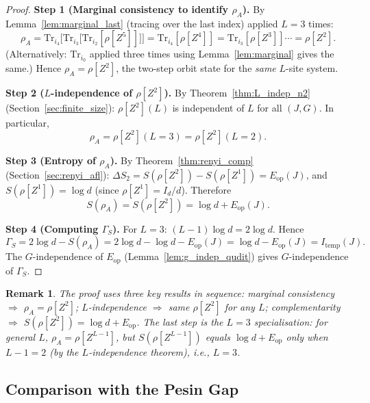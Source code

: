 \documentclass[12pt,a4paper]{article}
\newtheorem{remark}[theorem]{Remark}
\begin{document}
\begin{proof}
\textbf{Step 1 (Marginal consistency to identify $\rho_A$).}
By Lemma~\ref{lem:marginal_last} (tracing over the last index) applied $L=3$ times:
\[
  \rho_A
  = \mathrm{Tr}_{i_4}\bigl[\mathrm{Tr}_{i_3}\bigl[\mathrm{Tr}_{i_2}[\rho[Z^5]]\bigr]\bigr]
  = \mathrm{Tr}_{i_4}[\rho[Z^4]]
  = \mathrm{Tr}_{i_3}[\rho[Z^3]]
  \cdots
  = \rho[Z^2].
\]
(Alternatively: $\mathrm{Tr}_{i_0}$ applied three times using Lemma~\ref{lem:marginal} gives the same.)
Hence $\rho_A = \rho[Z^2]$, the two-step orbit state for the \emph{same} $L$-site system.

\textbf{Step 2 ($L$-independence of $\rho[Z^2]$).}
By Theorem~\ref{thm:L_indep_n2} (Section~\ref{sec:finite_size}):
$\rho[Z^2](L)$ is independent of $L$ for all $(J,G)$. In particular,
\[
  \rho_A = \rho[Z^2](L=3) = \rho[Z^2](L=2).
\]

\textbf{Step 3 (Entropy of $\rho_A$).}
By Theorem~\ref{thm:renyi_comp} (Section~\ref{sec:renyi_afl}):
$\Delta S_2 = S(\rho[Z^2])-S(\rho[Z^1]) = E_{\mathrm{op}}(J)$,
and $S(\rho[Z^1])=\log d$ (since $\rho[Z^1]=I_d/d$). Therefore
\[
  S(\rho_A) = S(\rho[Z^2]) = \log d + E_{\mathrm{op}}(J).
\]

\textbf{Step 4 (Computing $\Gamma_S$).}
For $L=3$: $(L-1)\log d = 2\log d$. Hence
\[
  \Gamma_S = 2\log d - S(\rho_A)
  = 2\log d - \log d - E_{\mathrm{op}}(J)
  = \log d - E_{\mathrm{op}}(J)
  = I_{\mathrm{temp}}(J).
\]
The $G$-independence of $E_{\mathrm{op}}$ (Lemma~\ref{lem:g_indep_qudit}) gives
$G$-independence of $\Gamma_S$.
\end{proof}

\begin{remark}
The proof uses three key results in sequence:
marginal consistency $\Rightarrow$ $\rho_A=\rho[Z^2]$;
$L$-independence $\Rightarrow$ same $\rho[Z^2]$ for any $L$;
complementarity $\Rightarrow$ $S(\rho[Z^2])=\log d+E_{\mathrm{op}}$.
The last step is the $L=3$ specialisation: for general $L$,
$\rho_A = \rho[Z^{L-1}]$, but $S(\rho[Z^{L-1}])$ equals $\log d + E_{\mathrm{op}}$ only
when $L-1=2$ (by the $L$-independence theorem), i.e., $L=3$.
\end{remark}

\subsection{Comparison with the Pesin Gap}
\label{subsec:gamma_vs_pesin}
\end{document}

